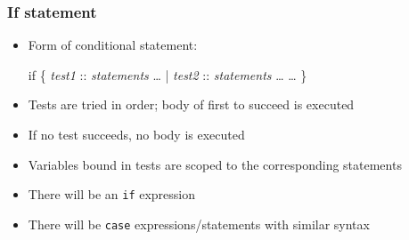 \documentclass[12pt]{beamer}
\begin{document}
\begin{frame}[fragile]
\frametitle{If statement}
\begin{itemize}
\item Form of conditional statement: \\[-1ex]
  \begin{minipage}{0.95\linewidth}
    \begin{block}{}
\begin{semiverbatim}
if \{ \emph{test1} :: \emph{statements} \ldots
   | \emph{test2} :: \emph{statements} \ldots
   \ldots
\}
\end{semiverbatim}
    \end{block}
  \end{minipage}
\item Tests are tried in order; body of first to succeed is executed
\item If no test succeeds, no body is executed
\item Variables bound in tests are scoped to the corresponding statements
\item There will be an \texttt{if} expression
\item There will be \texttt{case} expressions/statements with similar syntax
\end{itemize}
\end{frame}
\end{document}
